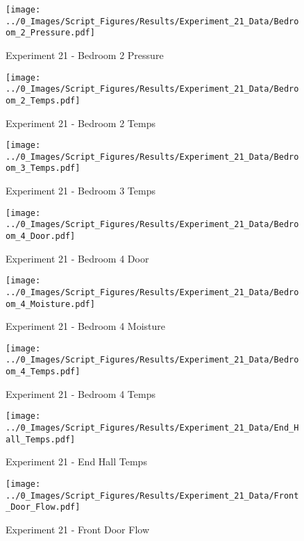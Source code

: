 	\clearpage

	\begin{figure}[H]
		\centering
		\texttt{[image: ../0\_Images/Script\_Figures/Results/Experiment\_21\_Data/Bedroom\_2\_Pressure.pdf]}
		\caption[]{Experiment 21 - Bedroom 2 Pressure}
	\end{figure}
 

	\begin{figure}[H]
		\centering
		\texttt{[image: ../0\_Images/Script\_Figures/Results/Experiment\_21\_Data/Bedroom\_2\_Temps.pdf]}
		\caption[]{Experiment 21 - Bedroom 2 Temps}
	\end{figure}
 
	\clearpage

	\begin{figure}[H]
		\centering
		\texttt{[image: ../0\_Images/Script\_Figures/Results/Experiment\_21\_Data/Bedroom\_3\_Temps.pdf]}
		\caption[]{Experiment 21 - Bedroom 3 Temps}
	\end{figure}
 

	\begin{figure}[H]
		\centering
		\texttt{[image: ../0\_Images/Script\_Figures/Results/Experiment\_21\_Data/Bedroom\_4\_Door.pdf]}
		\caption[]{Experiment 21 - Bedroom 4 Door}
	\end{figure}
 
	\clearpage

	\begin{figure}[H]
		\centering
		\texttt{[image: ../0\_Images/Script\_Figures/Results/Experiment\_21\_Data/Bedroom\_4\_Moisture.pdf]}
		\caption[]{Experiment 21 - Bedroom 4 Moisture}
	\end{figure}
 

	\begin{figure}[H]
		\centering
		\texttt{[image: ../0\_Images/Script\_Figures/Results/Experiment\_21\_Data/Bedroom\_4\_Temps.pdf]}
		\caption[]{Experiment 21 - Bedroom 4 Temps}
	\end{figure}
 
	\clearpage

	\begin{figure}[H]
		\centering
		\texttt{[image: ../0\_Images/Script\_Figures/Results/Experiment\_21\_Data/End\_Hall\_Temps.pdf]}
		\caption[]{Experiment 21 - End Hall Temps}
	\end{figure}
 

	\begin{figure}[H]
		\centering
		\texttt{[image: ../0\_Images/Script\_Figures/Results/Experiment\_21\_Data/Front\_Door\_Flow.pdf]}
		\caption[]{Experiment 21 - Front Door Flow}
	\end{figure}
 
